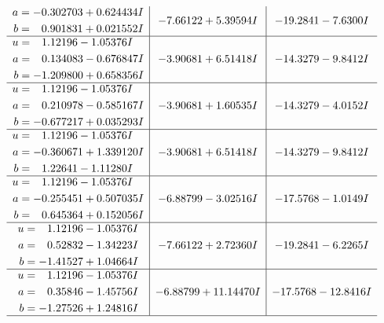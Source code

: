 \documentclass[1p]{elsarticle_modified}
\theoremstyle{definition}
\begin{document}
$$\begin{array}{c|c|c}
\begin{aligned}
a &= -0.302703 + 0.624434 I \\
b &= \phantom{-}0.901831 + 0.021552 I\end{aligned}
 & -7.66122 + 5.39594 I & -19.2841 - 7.6300 I \\ \hline\begin{aligned}
u &= \phantom{-}1.12196 - 1.05376 I \\
a &= \phantom{-}0.134083 - 0.676847 I \\
b &= -1.209800 + 0.658356 I\end{aligned}
 & -3.90681 + 6.51418 I & -14.3279 - 9.8412 I \\ \hline\begin{aligned}
u &= \phantom{-}1.12196 - 1.05376 I \\
a &= \phantom{-}0.210978 - 0.585167 I \\
b &= -0.677217 + 0.035293 I\end{aligned}
 & -3.90681 + 1.60535 I & -14.3279 - 4.0152 I \\ \hline\begin{aligned}
u &= \phantom{-}1.12196 - 1.05376 I \\
a &= -0.360671 + 1.339120 I \\
b &= \phantom{-}1.22641 - 1.11280 I\end{aligned}
 & -3.90681 + 6.51418 I & -14.3279 - 9.8412 I \\ \hline\begin{aligned}
u &= \phantom{-}1.12196 - 1.05376 I \\
a &= -0.255451 + 0.507035 I \\
b &= \phantom{-}0.645364 + 0.152056 I\end{aligned}
 & -6.88799 - 3.02516 I & -17.5768 - 1.0149 I \\ \hline\begin{aligned}
u &= \phantom{-}1.12196 - 1.05376 I \\
a &= \phantom{-}0.52832 - 1.34223 I \\
b &= -1.41527 + 1.04664 I\end{aligned}
 & -7.66122 + 2.72360 I & -19.2841 - 6.2265 I \\ \hline\begin{aligned}
u &= \phantom{-}1.12196 - 1.05376 I \\
a &= \phantom{-}0.35846 - 1.45756 I \\
b &= -1.27526 + 1.24816 I\end{aligned}
 & -6.88799 + 11.14470 I & -17.5768 - 12.8416 I\\
 \hline 

\end{array}$$
\end{document}
